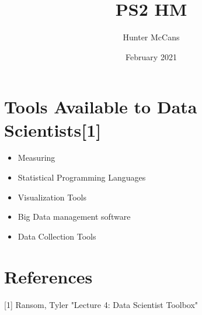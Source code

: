 \documentclass{article}
\title{PS2 HM}
\author{Hunter McCans}
\date{February 2021}
\begin{document}
\maketitle
\section{Tools Available to Data Scientists[1]}

\begin{itemize}
    \item Measuring
    \item Statistical Programming Languages
    \item Visualization Tools
    \item Big Data management software
    \item Data Collection Tools
\end{itemize}

\maketitle
\section{References}
[1] Ransom, Tyler "Lecture 4: Data Scientist Toolbox"
\end{document}
